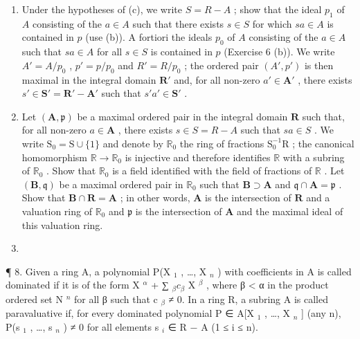 \begin{enumerate}
\def\labelenumi{(\alph{enumi})}
\setcounter{enumi}{3}
\item
  Under the hypotheses of (c), we write \(S = R - A\) ; show that the ideal \(p_1\) of \(A\) consisting of the \(a \in A\) such that there exists \(s \in S\) for which \(sa \in A\) is contained in \(p\) (use (b)). A fortiori the ideals \(p_0\) of \(A\) consisting of the \(a \in A\) such that \(sa \in A\) for all \(s \in S\) is contained in \(p\) (Exercise 6 (b)). We write \(A' = A / p_0\) , \(p' = p / p_0\) and \(R' = R / p_0\) ; the ordered pair \((A', p')\) is then maximal in the integral domain \(\mathbf{R}'\) and, for all non-zero \(a' \in \mathbf{A}'\) , there exists \(s' \in \mathbf{S}' = \mathbf{R}' - \mathbf{A}'\) such that \(s'a' \in \mathbf{S}'\) .
\item
  Let \((\mathbf{A},\mathfrak{p})\) be a maximal ordered pair in the integral domain \(\mathbf{R}\) such that, for all non-zero \(a\in \mathbf{A}\) , there exists \(s\in S = R - A\) such that \(sa\in S\) . We write \(\mathrm{S}_0 = \mathrm{S}\cup \{1\}\) and denote by \(\mathbb{R}_0\) the ring of fractions \(\mathrm{S}_0^{-1}\mathrm{R}\) ; the canonical homomorphism \(\mathbb{R}\to \mathbb{R}_0\) is injective and therefore identifies \(\mathbb{R}\) with a subring of \(\mathbb{R}_0\) . Show that \(\mathbb{R}_0\) is a field identified with the field of fractions of \(\mathbb{R}\) . Let \((\mathbf{B},\mathfrak{q})\) be a maximal ordered pair in \(\mathbb{R}_0\) such that \(\mathbf{B}\supset \mathbf{A}\) and \(\mathfrak{q}\cap \mathbf{A} = \mathfrak{p}\) . Show that \(\mathbf{B}\cap \mathbf{R} = \mathbf{A}\) ; in other words, \(\mathbf{A}\) is the intersection of \(\mathbf{R}\) and a valuation ring of \(\mathbb{R}_0\) and \(\mathfrak{p}\) is the intersection of \(\mathbf{A}\) and the maximal ideal of this valuation ring.
\item
\end{enumerate}

¶ 8. Given a ring A, a polynomial P(X \(_{1}\) , \ldots, X \(_{n}\) ) with coefficients in A is called dominated if it is of the form X \(^{\alpha}\) + ∑ \(_{\beta} c_{\beta}\) X \(^{\beta}\) , where β \textless{} α in the product ordered set N \(^{n}\) for all β such that c \(_{\beta}\) ≠ 0. In a ring R, a subring A is called paravaluative if, for every dominated polynomial P ∈ A{[}X \(_{1}\) , \ldots, X \(_{n}\) {]} (any n), P(s \(_{1}\) , \ldots, s \(_{n}\) ) ≠ 0 for all elements s \(_{i}\) ∈ R − A (1 ≤ i ≤ n).

